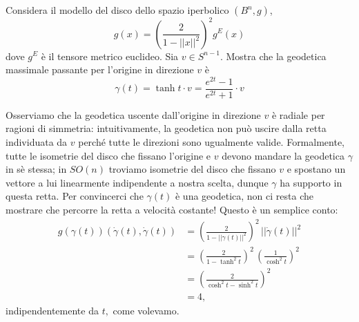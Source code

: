 \documentclass[a4paper]{article}
\begin{document}
\begin{ex}[10.2]{Considera il modello del disco dello spazio iperbolico $ (B^n, g) $, \[ g(x) = \left(\frac{2}{1-||x||^2}\right)^2 g^E(x) \] dove $ g^E $ è il tensore metrico euclideo. Sia $ v \in S^{n-1}$. Mostra che la geodetica massimale passante per l’origine in direzione $ v $ è \[ \gamma(t) = \tanh t \cdot v = \frac{e^{2t}-1}{e^{2t}+1} \cdot v \]}
	
	Osserviamo che la geodetica uscente dall'origine in direzione $ v $ è radiale per ragioni di simmetria: intuitivamente, la geodetica non può uscire dalla retta individuata da $ v $ perché tutte le direzioni sono ugualmente valide. Formalmente, tutte le isometrie del disco che fissano l'origine e $ v $ devono mandare la geodetica $ \gamma $ in sè stessa; in $ SO(n) $ troviamo isometrie del disco che fissano $ v $ e spostano un vettore a lui linearmente indipendente a nostra scelta, dunque $ \gamma $ ha supporto in questa retta. Per convincerci che $ \gamma(t) $ è una geodetica, non ci resta che mostrare che percorre la retta a velocità costante! Questo è un semplice conto:
	\begin{align*}
		g(\gamma(t))(\dot{\gamma}(t), \dot{\gamma}(t)) &= \left(\frac{2}{1-||\gamma(t)||^2}\right)^2 \, ||\dot{\gamma}(t)||^2 \\
		&=\left(\frac{2}{1-\tanh^2 t}\right)^2 \, \left(\frac{1}{\cosh^2 t}\right)^2 \\
		& = \left(\frac{2}{\cosh^2t -\sinh^2t}\right)^2 \\
		& = 4,
	\end{align*}
	indipendentemente da $ t, $ come volevamo.
\end{ex}
\end{document}
